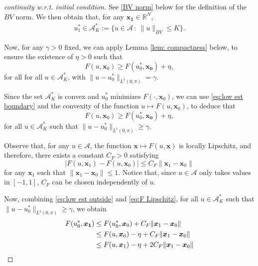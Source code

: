 \documentclass[9pt,shortpaper,twoside,web]{ieeecolor}
\begin{document}
\begin{proof}[continuity w.r.t. initial condition]
	See \eqref{BV norm} below for the definition of the $BV$ norm. We then obtain that, for any $\bm{x_1}\in \mathbb{R}^N$,
	\begin{align*}
		u_1^\ast\in \mathcal{A}_K^\ast:= \{ u\in \mathcal{A}\, : \ \| u\|_{BV} \leq K \}.
	\end{align*}
	
	Now, for any $\gamma>0$ fixed, we can apply Lemma \ref{lem: compactness} below, to ensure the existence of $\eta>0$ such that
	\begin{equation}\label{eq:low est boundary}
		F(u, \bm{x}_0)  \geq F(u_0^\ast, \bm{x_0})  + \eta,
	\end{equation}
	for all for all $u\in \mathcal{A}_K^\ast$, with $\| u-u_0^\ast\|_{L^1(0,\pi)} =\gamma$.
	
	Since the set $\mathcal{A}_K^\ast$ is convex and $u_0^\ast$ minimizes $F(\cdot , \bm{x}_0)$, we can use \eqref{eq:low est boundary} and the convexity of the function $u\mapsto F(u, \bm{x}_0)$, to deduce that
	\begin{equation}\label{eq:low est outside}
		F(u, \bm{x}_0)  \geq F(u_0^\ast, \bm{x_0})  + \eta,
	\end{equation}
	for all $u\in \mathcal{A}_K^\ast$ such that  $\| u-u_0^\ast\|_{L^1(0,\pi)} \geq \gamma$.
	
	Observe that, for any $u\in \mathcal{A}$, the function $\bm{x} \mapsto F(u, \bm{x})$  is  locally Lipschitz, and therefore,  there exists a constant $C_F>0$ satisfying
	\begin{equation}\label{eq:F Lipschitz}
		|F(u,  \bm{x}_1) -  F(u,  \bm{x}_0) |\leq  C_F \| \bm{x}_1 - \bm{x}_0\|
	\end{equation}
	for any  $\bm{x}_1$ such that $\| \bm{x}_1-\bm{x}_0\| \leq 1$. Notice that, since $u\in\mathcal{A}$ only takes values in $[-1,1]$, $C_F$ can be chosen independently of $u$.
	
	Now,  combining  \eqref{eq:low est outside} and \eqref{eq:F Lipschitz}, for all $u\in \mathcal{A}_K^\ast$ such that $\| u-u_0^\ast\|_{L^1(0,\pi)} \geq \gamma$, we obtain
	\begin{align}\label{estimate eta}
		F(u_0^\ast, \bm{x_1}) & \leq F(u_0^\ast,  \bm{x}_0) +  C_F \| \bm{x}_1- \bm{x}_0\| \notag 
		\\
		& \leq F(u,  \bm{x}_0) - \eta +  C_F \| \bm{x}_1- \bm{x}_0\| 
		\\
		& \leq F(u,  \bm{x}_1) - \eta  + 2 C_F \| \bm{x}_1- \bm{x}_0\| \notag  
	\end{align}
	

\end{proof}
\end{document}
